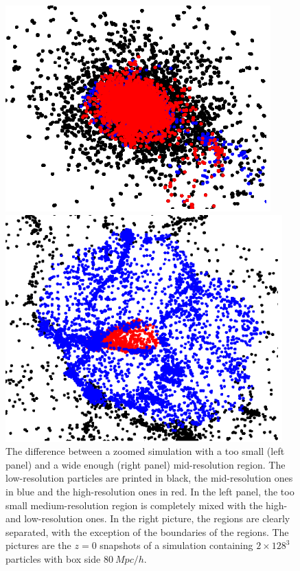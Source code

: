 \documentclass[11pt,a4paper,titlepage]{article}
\begin{document}
\begin{figure}[!tbp]
\begin{minipage}{0.5\textwidth}
\includegraphics[width=\textwidth,left]{intruders1.png}
\end{minipage}
\begin{minipage}{0.5\textwidth}
\includegraphics[width=0.95\textwidth,right]{intruders2.png}
\end{minipage}
\caption{The difference between a zoomed simulation with a too small (left panel) and a wide enough (right panel) mid-resolution region. The low-resolution particles are printed in black, the mid-resolution ones in blue and the high-resolution ones in red. In the left panel, the too small medium-resolution region is completely mixed with the high- and low-resolution ones. In the right picture, the regions are clearly separated, with the exception of the boundaries of the regions. The pictures are the $z=0$ snapshots of a simulation containing $2 \times 128^3$ particles with box side $80~Mpc/h$.}
\label{intruders}
\end{figure}
\end{document}
